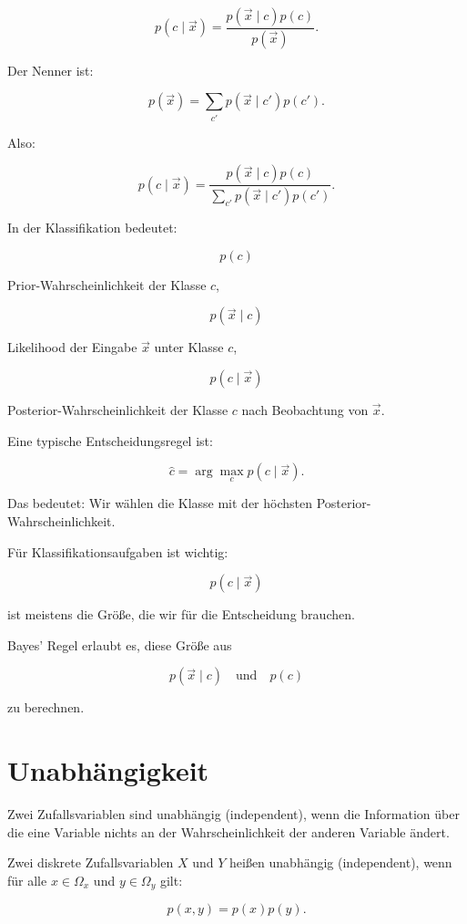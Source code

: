 \[
    p(c \mid \vec{x})
    =
    \frac{
        p(\vec{x} \mid c)p(c)
    }{
        p(\vec{x})
    }.
\]

Der Nenner ist:

\[
    p(\vec{x})
    =
    \sum_{c'} p(\vec{x} \mid c')p(c').
\]

Also:

\[
    p(c \mid \vec{x})
    =
    \frac{
        p(\vec{x} \mid c)p(c)
    }{
        \sum_{c'} p(\vec{x} \mid c')p(c')
    }.
\]

\begin{definitionbox}
In der Klassifikation bedeutet:

\[
    p(c)
\]

Prior-Wahrscheinlichkeit der Klasse \(c\),

\[
    p(\vec{x} \mid c)
\]

Likelihood der Eingabe \(\vec{x}\) unter Klasse \(c\),

\[
    p(c \mid \vec{x})
\]

Posterior-Wahrscheinlichkeit der Klasse \(c\) nach Beobachtung von \(\vec{x}\).
\end{definitionbox}

Eine typische Entscheidungsregel ist:

\[
    \hat{c}
    =
    \arg\max_c p(c \mid \vec{x}).
\]

Das bedeutet:
Wir wählen die Klasse mit der höchsten Posterior-Wahrscheinlichkeit.

\begin{examtipbox}
Für Klassifikationsaufgaben ist wichtig:

\[
    p(c \mid \vec{x})
\]

ist meistens die Größe, die wir für die Entscheidung brauchen.

Bayes' Regel erlaubt es, diese Größe aus

\[
    p(\vec{x} \mid c)
    \quad
    \text{und}
    \quad
    p(c)
\]

zu berechnen.
\end{examtipbox}

\section{Unabhängigkeit}

Zwei Zufallsvariablen sind unabhängig (independent), wenn die Information über die eine Variable nichts an der Wahrscheinlichkeit der anderen Variable ändert.

\begin{definitionbox}
Zwei diskrete Zufallsvariablen \(X\) und \(Y\) heißen unabhängig (independent), wenn für alle \(x \in \Omega_x\) und \(y \in \Omega_y\) gilt:

\[
    p(x,y)
    =
    p(x)p(y).
\]
\end{definitionbox}

